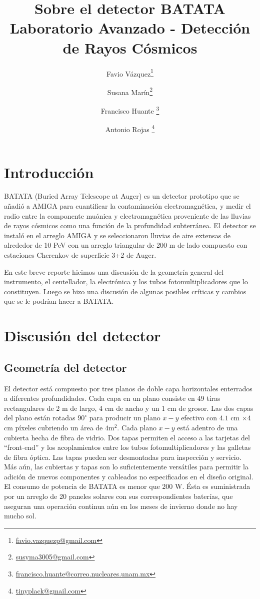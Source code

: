 \documentclass[a4paper,10pt]{article}
\title{{\huge Sobre el detector BATATA} \\
\vspace{.2cm}
\large Laboratorio Avanzado - Detección de Rayos Cósmicos}
\author[1]{Favio Vázquez\footnote{\url{favio.vazquezp@gmail.com}}}
\author[2]{Susana Marín\footnote{\url{susyma3005@gmail.com}}}
\author[1]{Francisco Huante \footnote{\url{francisco.huante@correo.nucleares.unam.mx}}}
\author[3]{Antonio Rojas \footnote{\url{tinyplack@gmail.com}}}
\affil[1]{Instituto de Ciencias Nucleares,
Universidad Nacional Autónoma de México}
\affil[2]{Instituto de Química,
Universidad Nacional Autónoma de México}
\affil[3]{Instituto de Física,
Universidad Nacional Autónoma de México}
\date{}
\numberwithin{equation}{section}
\begin{document}
\maketitle

\tableofcontents

\newpage

\section*{Introducción}

BATATA (Buried Array Telescope at Auger) es un detector prototipo que se añadió 
a AMIGA para cuantificar la contaminación electromagnética, y medir el radio entre
la componente muónica y electromagnética proveniente de las lluvias de rayos cósmicos 
como una función de la profundidad subterránea. El detector se instaló en el 
arreglo AMIGA y se seleccionaron lluvias de aire extensas de alrededor de 10 PeV 
con un arreglo triangular de 200 m de lado compuesto con estaciones Cherenkov
de superficie 3+2 de Auger.

\vspace{.3cm}

En este breve reporte hicimos una discusión de la geometría general del instrumento, 
el centellador, la electrónica y los tubos fotomultiplicadores que lo constituyen. Luego 
se hizo una discusión de algunas posibles críticas y cambios que se le podrían hacer 
a BATATA.

\newpage

\section{Discusión del detector}

\subsection{Geometría del detector}

El detector está compuesto por tres planos de doble capa horizontales enterrados 
a diferentes profundidades. Cada capa en un plano consiste en 49 tiras rectangulares 
de 2 m de largo, 4 cm de ancho y un 1 cm de grosor. Las dos capas del plano están 
rotadas $90^\circ$ para producir un plano $x-y$ efectivo con $4.1$ cm $\times 4$ cm 
píxeles cubriendo un área de $4$m$^2$. Cada plano $x-y$ está adentro de una cubierta 
hecha de fibra de vidrio. Dos tapas permiten el acceso a las tarjetas del ``front-end'' 
y los acoplamientos entre los tubos fotomultiplicadores y las galletas de fibra 
óptica. Las tapas pueden ser desmontadas para inspección y servicio. Más aún, las 
cubiertas y tapas son lo suficientemente versátiles para permitir la adición de 
nuevos componentes y cableados no especificados en el diseño original. El consumo 
de potencia de BATATA es menor que 200 W. Ésta es suministrada por un arreglo 
de 20 paneles solares con sus correspondientes baterías, que aseguran una operación 
continua aún en los meses de invierno donde no hay mucho sol. 
\end{document}
